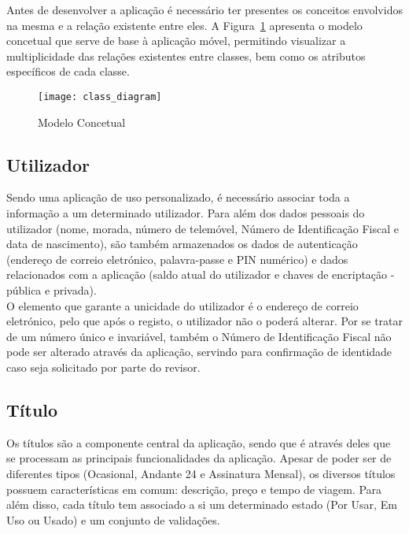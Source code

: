 Antes de desenvolver a aplicação é necessário ter presentes os conceitos envolvidos na mesma e a relação existente entre eles. A Figura~\ref{fig:class_diagram} apresenta o modelo concetual que serve de base à aplicação móvel, permitindo visualizar a multiplicidade das relações existentes entre classes, bem como os atributos específicos de cada classe.

\begin{figure}[t]
  \begin{center}
    \leavevmode
    \texttt{[image: class\_diagram]}
    \caption{Modelo Concetual}
    \label{fig:class_diagram}
  \end{center}
\end{figure}

\subsection{Utilizador}

Sendo uma aplicação de uso personalizado, é necessário associar toda a informação a um determinado utilizador. Para além dos dados pessoais do utilizador (nome, morada, número de telemóvel, Número de Identificação Fiscal e data de nascimento), são também armazenados os dados de autenticação (endereço de correio eletrónico, palavra-passe e PIN numérico) e dados relacionados com a aplicação (saldo atual do utilizador e chaves de encriptação - pública e privada).
\\O elemento que garante a unicidade do utilizador é o endereço de correio eletrónico, pelo que após o registo, o utilizador não o poderá alterar. Por se tratar de um número único e invariável, também o Número de Identificação Fiscal não pode ser alterado através da aplicação, servindo para confirmação de identidade caso seja solicitado por parte do revisor.

\subsection{Título}

Os títulos são a componente central da aplicação, sendo que é através deles que se processam as principais funcionalidades da aplicação. Apesar de poder ser de diferentes tipos (Ocasional, Andante 24 e Assinatura Mensal), os diversos títulos possuem características em comum: descrição, preço e tempo de viagem. Para além disso, cada título tem associado a si um determinado estado (Por Usar, Em Uso ou Usado) e um conjunto de validações.

